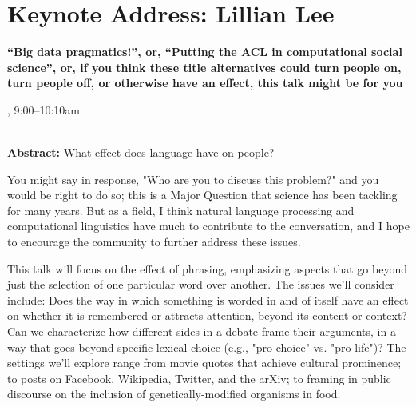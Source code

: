 \section{Keynote Address: Lillian Lee}

\begin{center}

\begin{Large}
{\bfseries\Large ``Big data pragmatics!'', or, ``Putting the ACL in computational social science'', or, if you think these title alternatives could turn people on, turn people off, or otherwise have an effect, this talk might be for you}\vspace{1em}\par
\end{Large}


\daydateyear, 9:00--10:10am \vspace{1em}\\
\PlenaryLoc \\
\vspace{1em}\par
\end{center}

\noindent
{\bfseries Abstract:} What effect does language have on people?

You might say in response, "Who are you to discuss this problem?" and
you would be right to do so; this is a Major Question that science has
been tackling for many years. But as a field, I think natural language
processing and computational linguistics have much to contribute to
the conversation, and I hope to encourage the community to further
address these issues.

This talk will focus on the effect of phrasing, emphasizing aspects
that go beyond just the selection of one particular word over
another. The issues we'll consider include: Does the way in which
something is worded in and of itself have an effect on whether it is
remembered or attracts attention, beyond its content or context? Can
we characterize how different sides in a debate frame their arguments,
in a way that goes beyond specific lexical choice (e.g., "pro-choice"
vs. "pro-life")? The settings we'll explore range from movie quotes
that achieve cultural prominence; to posts on Facebook, Wikipedia,
Twitter, and the arXiv; to framing in public discourse on the
inclusion of genetically-modified organisms in food.


